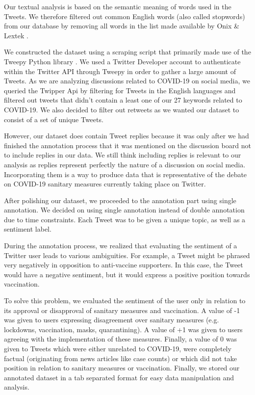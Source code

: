 \documentclass[letterpaper]{article} %
\begin{document}

Our textual analysis is based on the semantic meaning of words used in the Tweets. We therefore filtered out common English words (also called stopwords) from our database by removing all words in the list made available by Onix \& Lextek \cite{BrigadirRepo}. 


We constructed the dataset using a scraping script that primarily made use of the Tweepy Python library \cite{roesslein2020tweepy}. We used a Twitter Developer account to authenticate within the Twitter API through Tweepy in order to gather a large amount of Tweets. As we are analyzing discussions related to COVID-19 on social media, we queried the Twipper Api by filtering for Tweets in the English languages and filtered out tweets that didn't contain a least one of our 27 keywords related to COVID-19. We also decided to filter out retweets as we wanted our dataset to consist of a set of unique Tweets. 

However, our dataset does contain Tweet replies because it was only after we had finished the annotation process that it was mentioned on the discussion board not to include replies in our data. We still think including replies is relevant to our analysis as replies represent perfectly the nature of a discussion on social media. Incorporating them is a way to produce data that is representative of the debate on COVID-19 sanitary measures currently taking place on Twitter.  

After polishing our dataset, we proceeded to the annotation part using single annotation. We decided on using single annotation instead of double annotation due to time constraints. Each Tweet was to be given a unique topic, as well as a sentiment label.

During the annotation process, we realized that evaluating the sentiment of a Twitter user leads to various ambiguities. For example, a Tweet might be phrased very negatively in opposition to anti-vaccine supporters. In this case, the Tweet would have a negative sentiment, but it would express a positive position towards vaccination. 

To solve this problem, we evaluated the sentiment of the user only in relation to its approval or disapproval of sanitary measures and vaccination. A value of -1 was given to users expressing disagreement over sanitary measures (e.g. lockdowns, vaccination, masks, quarantining). A value of +1 was given to users agreeing with the implementation of these measures. Finally, a value of 0 was given to Tweets which were either unrelated to COVID-19, were completely factual (originating from news articles like case counts) or which did not take position in relation to sanitary measures or vaccination. Finally, we stored our annotated dataset in a tab separated format for easy data manipulation and analysis. 
\end{document}
